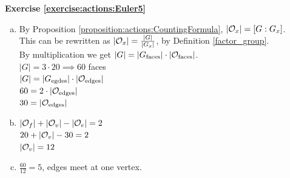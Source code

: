 \noindent\textbf{Exercise \ref{exercise:actions:Euler5}}
\begin{enumerate}[(a)]
\item
By Proposition \ref{proposition:actions:CountingFormula}, $|{\cal O}_x| = [G : G_x]$.  
\\
This can be rewritten as $|{\cal O}_x| = \frac{|G|}{|{G_x|}}$, by Definition \ref{factor_group}.
\\
By multiplication we get $|G| = |G_\text{faces}| \cdot |{\cal O}_\text{faces}|$. 
\\
$|G| = 3 \cdot 20 \implies 60$ faces
\\
$|G| = |G_\text{egdes}| \cdot |{\cal O}_\text{edges}|$
\\
$60 = 2 \cdot |{\cal O}_\text{edges}|$
\\
$30 = |{\cal O}_\text{edges}|$

\item
$|{\cal O}_f| + |{\cal O}_v| - |{\cal O}_e| = 2$
\\
$20 +  |{\cal O}_v| -30 = 2$
\\
$ |{\cal O}_v| = 12$

\item
$\frac{60}{12} = 5$, edges meet at one vertex.
\end{enumerate}
 
